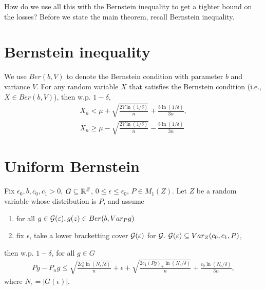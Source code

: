 \documentclass[twoside]{article}
\begin{document}
How do we use all this with the Bernstein inequality to get a tighter bound on the losses?  Before we state the main theorem, recall Bernstein inequality.

\section{Bernstein inequality}
We use $Ber(b, V)$ to denote the Bernstein condition with parameter $b$ and variance $V$.  For any random variable $X$ that satisfies the Bernstein condition (i.e., $X \in Ber(b, V)$), then w.p. $1-\delta$, 
\begin{align}
    \bar X_n < \mu + \sqrt{\frac{2V \ln(1/\delta)}{n}} + \frac{b \ln(1/\delta)}{3n}, \\
    \bar X_n \geq \mu - \sqrt{\frac{2V \ln(1/\delta)}{n}} - \frac{b \ln(1/\delta)}{3n}
\end{align}

\section{Uniform Bernstein}
\begin{theorem}
    Fix $\epsilon_0, b, c_0, c_1 > 0$, $G \subseteq \mathbb{R}^Z$, $0 \leq \epsilon \leq \epsilon_0$, $P \in M_1(Z)$.  Let $Z$ be a random variable whose distribution is $P$, and assume
\begin{enumerate}
    \item for all $g \in \mathcal{G}(\varepsilon), g(z) \in Ber(b, Var_{P}g)$
    \item fix $\epsilon$, take a lower bracketting cover $\mathcal{G}(\varepsilon)$ for $\mathcal{G}$.  $\mathcal{G}(\varepsilon) \subseteq Var_Z(c_0, c_1, P)$,
\end{enumerate}
then w.p. $1- \delta$, for all $g \in G$
\begin{align}
    Pg - P_n g \leq \sqrt{\frac{2 c_0^2 \ln(N_{\epsilon}/\delta)}{n}} + \epsilon + \sqrt{\frac{2 c_1 (Pg)_+ \ln(N_\epsilon / \delta)}{n}} + \frac{c_0 \ln(N_\epsilon/\delta)}{3n},
\end{align}
where $N_\epsilon = |G(\epsilon)|$.
\end{theorem}
\end{document}
